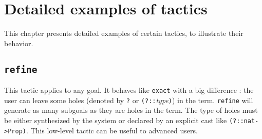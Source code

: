 \chapter{Detailed examples of tactics}
\label{Tactics-examples}

This chapter presents detailed examples of certain tactics, to
illustrate their behavior.

\section{\tt refine}
\label{refine-example}

This tactic applies to any goal. It behaves like {\tt exact} with a
big difference : the user can leave some holes (denoted by \texttt{?} or 
{\tt (?::}{\it type}{\tt )}) in the term. 
{\tt refine} will generate as many
subgoals as they are holes in the term. The type of holes must be
either synthesized by the system or declared by an
explicit cast like \verb|(?::nat->Prop)|. This low-level
tactic can be useful to advanced users.

\Example

